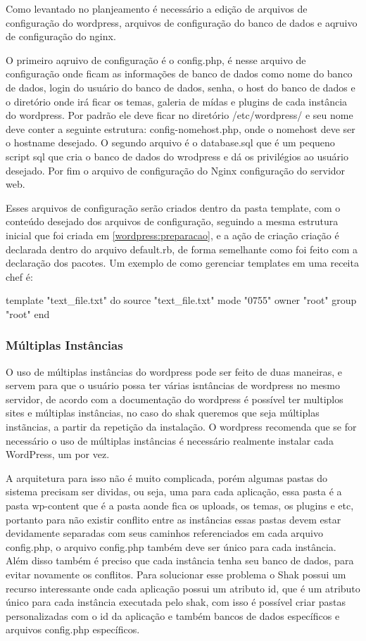 Como levantado no planjeamento é necessário a edição de arquivos de configuração
do wordpress, arquivos de configuração do banco de dados e aqruivo de configuração
do nginx.

O primeiro aqruivo de configuração é o config.php, é nesse arquivo de
configuração onde ficam as informações de banco de dados como nome do banco de dados,
login do usuário do banco de dados, senha, o host do banco de dados e o diretório
onde irá ficar os temas, galeria de mídas e plugins de cada instância do wordpress.
Por padrão ele deve ficar no diretório /etc/wordpress/ e seu nome deve conter
a seguinte estrutura: config-nomehost.php, onde o nomehost deve ser o hostname
desejado. O segundo arquivo é o database.sql que é um pequeno script sql que
cria o banco de dados do wrodpress e dá os privilégios ao usuário desejado. Por fim
o arquivo de configuração do Nginx configuração do servidor web.

Esses arquivos de configuração serão criados dentro da pasta template, com o conteúdo
desejado dos arquivos de configuração, seguindo a mesma estrutura
inicial que foi criada em \ref{wordpress:preparacao}, e a ação de criação criação é
declarada dentro do arquivo default.rb, de forma semelhante como foi feito com
a declaração dos pacotes. Um exemplo de como gerenciar templates em uma receita chef
é:

\begin{center}
  template "text\_file.txt" do
  source "text\_file.txt"
  mode "0755"
  owner "root"
  group "root"
end
\end{center}



\subsubsection{Múltiplas Instâncias}

O uso de múltiplas instâncias do wordpress pode ser feito de duas maneiras, e servem
para que o usuário possa ter várias isntâncias de wordpress no mesmo servidor, de
acordo com a documentação do wordpress é possível ter multiplos sites e múltiplas
instâncias, no caso do shak queremos que seja múltiplas instãncias, a partir da
repetição da instalação. O wordpress recomenda que se for necessário o uso de múltiplas
instâncias é necessário realmente instalar cada WordPress, um por vez.

A arquitetura para isso não é muito complicada, porém algumas pastas do sistema
precisam ser dividas, ou seja, uma para cada aplicação, essa pasta é a pasta wp-content
que é a pasta aonde fica os uploads, os temas, os plugins e etc, portanto para não
existir conflito entre as instâncias essas pastas devem estar devidamente separadas
com seus caminhos referenciados em cada arquivo config.php, o arquivo config.php também
deve ser único para cada instância. Além disso também é preciso que cada instância
tenha seu banco de dados, para evitar novamente os conflitos. Para
solucionar esse problema o Shak possui um recurso interessante onde cada aplicação
possui um atributo id, que é um atributo único para cada instância executada pelo
shak, com isso é possível criar pastas personalizadas com o id da aplicação e também
bancos de dados específicos e arquivos config.php específicos.

